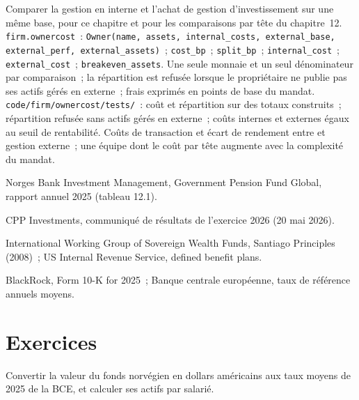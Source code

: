 \begin{build}
 Comparer la gestion en interne et l'achat de gestion d'investissement sur une même base, pour ce chapitre et pour les
comparaisons par tête du chapitre~12.
 \texttt{firm.ownercost}~:
\texttt{Owner(name, assets, internal\_costs, external\_base, external\_perf, external\_assets)}~; \texttt{cost\_bp}~; \texttt{split\_bp}~; \texttt{internal\_cost}~; \texttt{external\_cost}~;
\texttt{breakeven\_assets}.
 Une seule monnaie et un seul dénominateur par comparaison~; la répartition est refusée lorsque le propriétaire ne publie pas ses
actifs gérés en externe~; frais exprimés en points de base du mandat.
 \texttt{code/firm/ownercost/tests/}~: coût et répartition sur des totaux construits~; répartition refusée
sans actifs gérés en externe~; coûts internes et externes égaux au seuil de rentabilité.
 Coûts de transaction et écart de rendement entre  et gestion externe~; une équipe dont
le coût par tête augmente avec la complexité du mandat.
\end{build}

\begin{omsources}
\item Norges Bank Investment Management, Government Pension Fund Global, rapport annuel 2025 (tableau 12.1).
\item CPP Investments, communiqué de résultats de l'exercice 2026 (20 mai 2026).
\item International Working Group of Sovereign Wealth Funds, Santiago Principles (2008)~; US Internal Revenue Service,
defined benefit plans.
\item BlackRock, Form 10-K for 2025~; Banque centrale européenne, taux de référence annuels moyens.
\end{omsources}

\section{Exercices}

\begin{exercise}[$\star$]\label{exo:in:asset-managers-pensions-sovereign-funds-and-insurers:1}
Convertir la valeur du fonds norvégien en dollars américains aux taux moyens de 2025 de la BCE, et calculer ses actifs par salarié.
\end{exercise}


